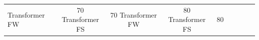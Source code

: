 \begin{table}
\begin{tabular}{|l|c|c|c|c|c|c|c|c|}
Transformer FW & 70%
Transformer FS & 70%
Transformer FW & 80%
Transformer FS & 80%
\bottomrule
\end{tabular}
\end{table}
